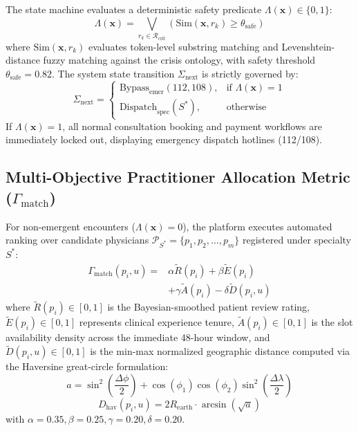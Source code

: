 \documentclass[conference]{IEEEtran}
\begin{document}
The state machine evaluates a deterministic safety predicate $\Lambda(\mathbf{x}) \in \{0, 1\}$:
\begin{equation}
\Lambda(\mathbf{x}) = \bigvee_{r_k \in \mathcal{R}_{\text{crit}}} \left( \text{Sim}(\mathbf{x}, r_k) \ge \theta_{\text{safe}} \right)
\end{equation}
where $\text{Sim}(\mathbf{x}, r_k)$ evaluates token-level substring matching and Levenshtein-distance fuzzy matching against the crisis ontology, with safety threshold $\theta_{\text{safe}} = 0.82$. The system state transition $\Sigma_{\text{next}}$ is strictly governed by:
\begin{equation}
\Sigma_{\text{next}} = \begin{cases} 
\text{Bypass}_{\text{emer}}(112, 108), & \text{if } \Lambda(\mathbf{x}) = 1 \\ 
\text{Dispatch}_{\text{spec}}(S^*), & \text{otherwise} 
\end{cases}
\end{equation}
If $\Lambda(\mathbf{x}) = 1$, all normal consultation booking and payment workflows are immediately locked out, displaying emergency dispatch hotlines (112/108).

\subsection{Multi-Objective Practitioner Allocation Metric ($\Gamma_{\text{match}}$)}
For non-emergent encounters ($\Lambda(\mathbf{x}) = 0$), the platform executes automated ranking over candidate physicians $\mathcal{P}_{S^*} = \{p_1, p_2, \dots, p_m\}$ registered under specialty $S^*$:
\begin{equation}
\begin{aligned}
\Gamma_{\text{match}}(p_i, u) ={} & \alpha \widetilde{R}(p_i) + \beta \widetilde{E}(p_i) \\
& + \gamma \widetilde{A}(p_i) - \delta \widetilde{D}(p_i, u)
\end{aligned}
\end{equation}
where $\widetilde{R}(p_i) \in [0, 1]$ is the Bayesian-smoothed patient review rating, $\widetilde{E}(p_i) \in [0, 1]$ represents clinical experience tenure, $\widetilde{A}(p_i) \in [0, 1]$ is the slot availability density across the immediate 48-hour window, and $\widetilde{D}(p_i, u) \in [0, 1]$ is the min-max normalized geographic distance computed via the Haversine great-circle formulation:
\begin{equation}
a = \sin^2\left(\frac{\Delta \phi}{2}\right) + \cos(\phi_1)\cos(\phi_2)\sin^2\left(\frac{\Delta \lambda}{2}\right)
\end{equation}
\begin{equation}
D_{\text{hav}}(p_i, u) = 2 R_{\text{earth}} \cdot \arcsin\left(\sqrt{a}\right)
\end{equation}
with $\alpha = 0.35, \beta = 0.25, \gamma = 0.20, \delta = 0.20$.
\end{document}
